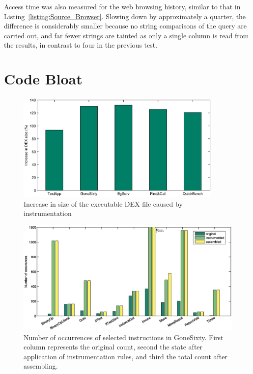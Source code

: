 \documentclass[12pt,twoside,notitlepage]{report}
\begin{document}
Access time was also measured for the web browsing history, similar to that in Listing~\ref{listing:Source_Browser}. Slowing down by approximately a quarter, the difference is considerably smaller because no string comparisons of the query are carried out, and far fewer strings are tainted as only a single column is read from the results, in contrast to four in the previous test.

\section{Code Bloat}

\begin{figure}
	\centerline{
		\includegraphics[width=0.9\textwidth]{figs/fig_eval_filesize.eps}
	}
	\caption{Increase in size of the executable DEX file caused by instrumentation}
	\label{figure:Evalutaion_FileSize}
\end{figure}

\begin{figure}
	\centerline{	
		\includegraphics[width=1.1\textwidth]{figs/fig_eval_codebloat.eps}
	}
	\caption{Number of occurrences of selected instructions in GoneSixty. First column represents the original count, second the state after application of instrumentation rules, and third the total count after assembling.}
	\label{figure:Evalutaion_CodeBloat}
\end{figure}
\end{document}
